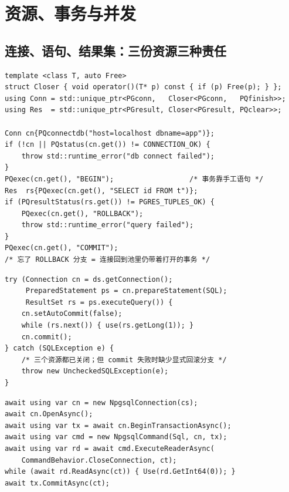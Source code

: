 \documentclass[12pt,a4paper,fontset=fandol]{ctexbook}
\begin{document}

\chapter{资源、事务与并发}

\section{连接、语句、结果集：三份资源三种责任}

\begin{lstlisting}[caption={C/C++：用智能指针把三类句柄管起来}]
template <class T, auto Free>
struct Closer { void operator()(T* p) const { if (p) Free(p); } };
using Conn = std::unique_ptr<PGconn,   Closer<PGconn,   PQfinish>>;
using Res  = std::unique_ptr<PGresult, Closer<PGresult, PQclear>>;

Conn cn{PQconnectdb("host=localhost dbname=app")};
if (!cn || PQstatus(cn.get()) != CONNECTION_OK) {
    throw std::runtime_error("db connect failed");
}
PQexec(cn.get(), "BEGIN");                  /* 事务靠手工语句 */
Res  rs{PQexec(cn.get(), "SELECT id FROM t")};
if (PQresultStatus(rs.get()) != PGRES_TUPLES_OK) {
    PQexec(cn.get(), "ROLLBACK");
    throw std::runtime_error("query failed");
}
PQexec(cn.get(), "COMMIT");
/* 忘了 ROLLBACK 分支 = 连接回到池里仍带着打开的事务 */
\end{lstlisting}

\begin{lstlisting}[style=javastyle,caption={Java：try-with-resources 一层不漏}]
try (Connection cn = ds.getConnection();
     PreparedStatement ps = cn.prepareStatement(SQL);
     ResultSet rs = ps.executeQuery()) {
    cn.setAutoCommit(false);
    while (rs.next()) { use(rs.getLong(1)); }
    cn.commit();
} catch (SQLException e) {
    /* 三个资源都已关闭；但 commit 失败时缺少显式回滚分支 */
    throw new UncheckedSQLException(e);
}
\end{lstlisting}

\begin{lstlisting}[style=csharpstyle,caption={C\#：await using 与异步 I/O}]
await using var cn = new NpgsqlConnection(cs);
await cn.OpenAsync();
await using var tx = await cn.BeginTransactionAsync();
await using var cmd = new NpgsqlCommand(Sql, cn, tx);
await using var rd = await cmd.ExecuteReaderAsync(
    CommandBehavior.CloseConnection, ct);
while (await rd.ReadAsync(ct)) { Use(rd.GetInt64(0)); }
await tx.CommitAsync(ct);
\end{lstlisting}
\end{document}
